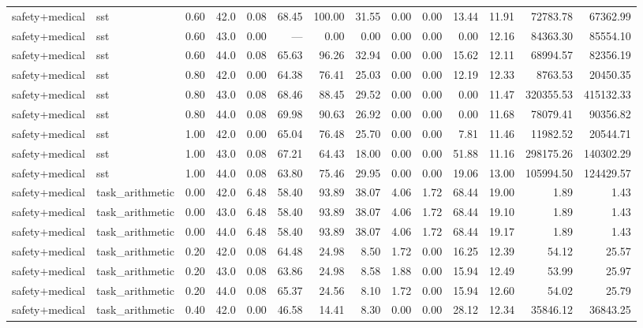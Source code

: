 \documentclass{article}
\begin{document}
\begin{table}[H]
{\begin{tabular}{llllrrrrrrrrrr}
safety+medical & sst & 0.60 & 42.0 & 0.08 & 68.45 & 100.00 & 31.55 & 0.00 & 0.00 & 13.44 & 11.91 & 72783.78 & 67362.99 \\
safety+medical & sst & 0.60 & 43.0 & 0.00 & --- & 0.00 & 0.00 & 0.00 & 0.00 & 0.00 & 12.16 & 84363.30 & 85554.10 \\
safety+medical & sst & 0.60 & 44.0 & 0.08 & 65.63 & 96.26 & 32.94 & 0.00 & 0.00 & 15.62 & 12.11 & 68994.57 & 82356.19 \\
safety+medical & sst & 0.80 & 42.0 & 0.00 & 64.38 & 76.41 & 25.03 & 0.00 & 0.00 & 12.19 & 12.33 & 8763.53 & 20450.35 \\
safety+medical & sst & 0.80 & 43.0 & 0.08 & 68.46 & 88.45 & 29.52 & 0.00 & 0.00 & 0.00 & 11.47 & 320355.53 & 415132.33 \\
safety+medical & sst & 0.80 & 44.0 & 0.08 & 69.98 & 90.63 & 26.92 & 0.00 & 0.00 & 0.00 & 11.68 & 78079.41 & 90356.82 \\
safety+medical & sst & 1.00 & 42.0 & 0.00 & 65.04 & 76.48 & 25.70 & 0.00 & 0.00 & 7.81 & 11.46 & 11982.52 & 20544.71 \\
safety+medical & sst & 1.00 & 43.0 & 0.08 & 67.21 & 64.43 & 18.00 & 0.00 & 0.00 & 51.88 & 11.16 & 298175.26 & 140302.29 \\
safety+medical & sst & 1.00 & 44.0 & 0.08 & 63.80 & 75.46 & 29.95 & 0.00 & 0.00 & 19.06 & 13.00 & 105994.50 & 124429.57 \\
safety+medical & task\_arithmetic & 0.00 & 42.0 & 6.48 & 58.40 & 93.89 & 38.07 & 4.06 & 1.72 & 68.44 & 19.00 & 1.89 & 1.43 \\
safety+medical & task\_arithmetic & 0.00 & 43.0 & 6.48 & 58.40 & 93.89 & 38.07 & 4.06 & 1.72 & 68.44 & 19.10 & 1.89 & 1.43 \\
safety+medical & task\_arithmetic & 0.00 & 44.0 & 6.48 & 58.40 & 93.89 & 38.07 & 4.06 & 1.72 & 68.44 & 19.17 & 1.89 & 1.43 \\
safety+medical & task\_arithmetic & 0.20 & 42.0 & 0.08 & 64.48 & 24.98 & 8.50 & 1.72 & 0.00 & 16.25 & 12.39 & 54.12 & 25.57 \\
safety+medical & task\_arithmetic & 0.20 & 43.0 & 0.08 & 63.86 & 24.98 & 8.58 & 1.88 & 0.00 & 15.94 & 12.49 & 53.99 & 25.97 \\
safety+medical & task\_arithmetic & 0.20 & 44.0 & 0.08 & 65.37 & 24.56 & 8.10 & 1.72 & 0.00 & 15.94 & 12.60 & 54.02 & 25.79 \\
safety+medical & task\_arithmetic & 0.40 & 42.0 & 0.00 & 46.58 & 14.41 & 8.30 & 0.00 & 0.00 & 28.12 & 12.34 & 35846.12 & 36843.25 \\

\end{tabular}}
\end{table}
\end{document}
